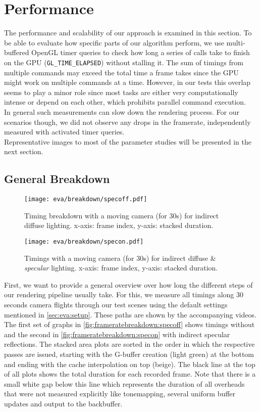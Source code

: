 \documentclass[thesis.tex]{subfiles}
\begin{document}
\section{Performance}
The performance and scalability of our approach is examined in this section.
To be able to evaluate how specific parts of our algorithm perform, we use multi-buffered OpenGL timer queries to check how long a series of calls take to finish on the GPU (\texttt{GL\_TIME\_ELAPSED}) without stalling it.
The sum of timings from multiple commands may exceed the total time a frame takes since the GPU might work on multiple commands at a time.
However, in our tests this overlap seems to play a minor role since most tasks are either very computationally intense or depend on each other, which prohibits parallel command execution.
\\
In general such measurements can slow down the rendering process.
For our scenarios though, we did not observe any drops in the framerate, independently measured with activated timer queries.
\\
Representative images to most of the parameter studies will be presented in the next section.

\subsection{General Breakdown}
\begin{figure}
\centering
\texttt{[image: eva/breakdown/specoff.pdf]}
\caption{Timing breakdown with a moving camera (for 30s) for indirect diffuse lighting. x-axis: frame index, y-axis: stacked duration.}
\label{fig:frameratebreakdown:specoff}
\end{figure}
\begin{figure}
\centering
\texttt{[image: eva/breakdown/specon.pdf]}
\caption{Timings with a moving camera  (for 30s) for indirect diffuse \& \emph{specular} lighting. x-axis: frame index, y-axis: stacked duration.}
\label{fig:frameratebreakdown:specon}
\end{figure}

First, we want to provide a general overview over how long the different steps of our rendering pipeline usually take.
For this, we measure all timings along 30 seconds camera flights through our test scenes using the default settings mentioned in \autoref{sec:eva:setup}.
These paths are shown by the accompanying videos.
The first set of graphs in \autoref{fig:frameratebreakdown:specoff} shows timings without and the second in \autoref{fig:frameratebreakdown:specon} with indirect specular reflections.
The stacked area plots are sorted in the order in which the respective passes are issued, starting with the G-buffer creation (light green) at the bottom and ending with the cache interpolation on top (beige).
The black line at the top of all plots shows the total duration for each recorded frame.
Note that there is a small white gap below this line which represents the duration of all overheads that were not measured explicitly like tonemapping, several uniform buffer updates and output to the backbuffer.
\end{document}
